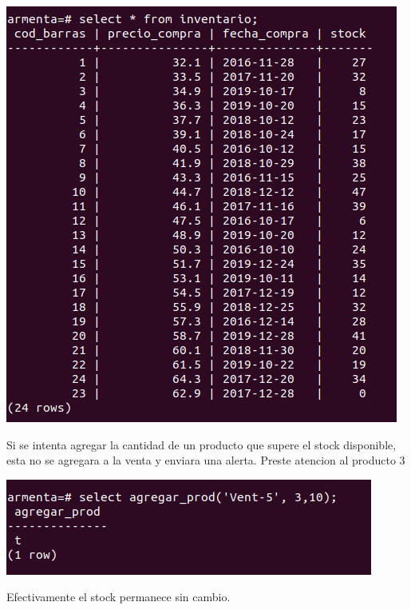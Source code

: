 \documentclass[12pt, letterpaper]{article}     %
\begin{document}
		\begin{center}
 	  	\includegraphics[scale=0.5]{trigger_disminuir_stock}
		\end{center}
		
		Si se intenta agregar la cantidad de un producto que supere el stock disponible, esta no se agregara a la venta y enviara una alerta. Preste atencion al producto 3
		
		\begin{center}
 	  	\includegraphics[scale=0.5]{agregar_prod_insuficiente}
		\end{center}
		
		Efectivamente el stock permanece sin cambio.
		
\end{document}
